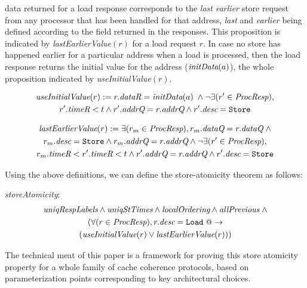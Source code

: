 data returned for a load response corresponds to the \emph{last earlier} store
request from any processor that has been handled for that address, \emph{last}
and \emph{earlier} being defined according to the field \timeR{} returned in
the responses.  This proposition is indicated by \textit{lastEarlierValue}$(r)$
for a load request $r$.  In case no store has happened earlier for a particular
address when a load is processed, then the load response returns the initial
value for the address ($\textit{initData}(a)$), the whole proposition indicated by
\textit{useInitialValue}$(r)$.
\begin{defn}
\small
\begin{multline*}
\textit{useInitialValue}(r) := r.\textit{dataR} = \textit{initData}(a) \; \wedge \neg \exists (r' \in \textit{ProcResp}), \\
r'.\textit{timeR} < t \wedge r'.\textit{addrQ} = r.\textit{addrQ} \wedge r'.\textit{desc} = \texttt{Store}
\end{multline*}
\label{useInitialValue}
\end{defn}
%
\begin{defn}
\small
\begin{multline*}
\textit{lastEarlierValue}(r) := \exists (r_m \in \textit{ProcResp}), r_m.\textit{dataQ} = r.\textit{dataQ} \; \wedge 
\\ r_m.\textit{desc} = \texttt{Store} \wedge r_m.\textit{addrQ} = r.\textit{addrQ} \wedge
\neg \exists (r' \in \textit{ProcResp}), \\
r_m.\textit{timeR} < r'.\textit{timeR} < t \wedge r'.\textit{addrQ} = r.\textit{addrQ} \wedge r'.\textit{desc} = \texttt{Store}
\end{multline*}
\label{lastEarlierValue}
\end{defn}
%
Using the above definitions, we can define the store-atomicity theorem as follows:
\begin{thm}\textit{storeAtomicity}:
\small
\begin{multline*}
\textit{uniqRespLabels} \wedge
\textit{uniqStTimes} \wedge \textit{localOrdering} \wedge \textit{allPrevious} \; \wedge \\
(\forall (r \in \textit{ProcResp}), r.\textit{desc} = \texttt{Load} \; @-> \\
(\textit{useInitialValue}(r) \vee \textit{lastEarlierValue}(r)))
\end{multline*}
\label{storeAtomicity}
\end{thm}

The technical meat of this paper is a framework for proving this store atomicity
property for a whole family of cache coherence protocols, based on parameterization
points corresponding to key architectural choices.

